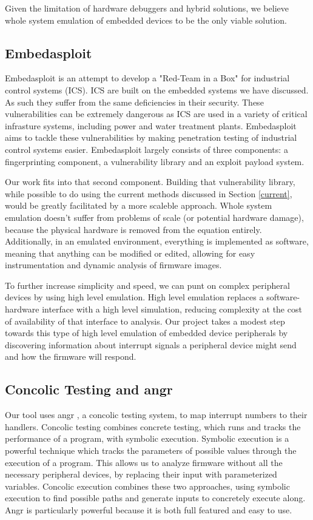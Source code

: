 \documentclass[letterpaper, 10 pt, conference]{ieeeconf}
\begin{document}
Given the limitation of hardware debuggers and hybrid solutions, we believe whole system emulation of embedded devices to be the only viable solution.

\subsection{Embedasploit} \label{embed}%
Embedasploit is an attempt to develop a "Red-Team in a Box" for industrial control systems (ICS). ICS are built on the embedded systems we have discussed. As such they suffer from the same deficiencies in their security. These vulnerabilities can be extremely dangerous as ICS are used in a variety of critical infrasture systems, including power and water treatment plants. Embedasploit aims to tackle these vulnerabilities by making penetration testing of industrial control systems easier. Embedasploit largely consists of three components: a fingerprinting component, a vulnerability library and an exploit payload system. 

Our work fits into that second component. Building that vulnerability library, while possible to do using the current methods discussed in Section \ref{current}, would be greatly facilitated by a more scaleble approach. Whole system emulation doesn't suffer from problems of scale (or potential hardware damage), because the physical hardware is removed from the equation entirely. Additionally, in an emulated environment, everything is implemented as software, meaning that anything can be modified or edited, allowing for easy instrumentation and dynamic analysis of firmware images. 

To further increase simplicity and speed, we can punt on complex peripheral devices by using high level emulation. High level emulation replaces a software-hardware interface with a high level simulation, reducing complexity at the cost of availability of that interface to analysis. Our project takes a modest step towards this type of high level emulation of embedded device peripherals by discovering information about interrupt signals a peripheral device might send and how the firmware will respond.

\subsection{Concolic Testing and angr} \label{concolic} %
Our tool uses angr \cite{angr}, a concolic testing system, to map interrupt numbers to their handlers. Concolic testing combines concrete testing, which runs and tracks the performance of a program, with symbolic execution. Symbolic execution is a powerful technique which tracks the parameters of possible values through the execution of a program. This allows us to analyze firmware without all the necessary peripheral devices, by replacing their input with parameterized variables. Concolic execution combines these two approaches, using symbolic execution to find possible paths and generate inputs to concretely execute along. Angr is particularly powerful because it is both full featured and easy to use. 
\end{document}
